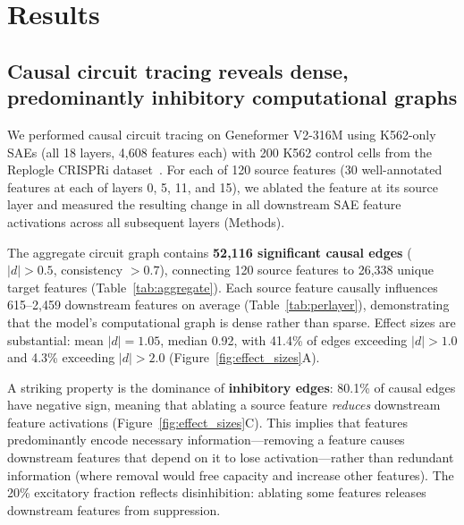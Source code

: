 \documentclass[onecolumn]{article}
\begin{document}
\section{Results}

\subsection{Causal circuit tracing reveals dense, predominantly inhibitory computational graphs}
\label{sec:circuits}

We performed causal circuit tracing on Geneformer V2-316M using K562-only SAEs (all 18 layers, 4,608 features each) with 200 K562 control cells from the Replogle CRISPRi dataset~\citep{replogle2022mapping}. For each of 120 source features (30 well-annotated features at each of layers 0, 5, 11, and 15), we ablated the feature at its source layer and measured the resulting change in all downstream SAE feature activations across all subsequent layers (Methods).

The aggregate circuit graph contains \textbf{52,116 significant causal edges} ($|d| > 0.5$, consistency $> 0.7$), connecting 120 source features to 26,338 unique target features (Table~\ref{tab:aggregate}). Each source feature causally influences 615--2,459 downstream features on average (Table~\ref{tab:perlayer}), demonstrating that the model's computational graph is dense rather than sparse. Effect sizes are substantial: mean $|d| = 1.05$, median 0.92, with 41.4\% of edges exceeding $|d| > 1.0$ and 4.3\% exceeding $|d| > 2.0$ (Figure~\ref{fig:effect_sizes}A).

A striking property is the dominance of \textbf{inhibitory edges}: 80.1\% of causal edges have negative sign, meaning that ablating a source feature \emph{reduces} downstream feature activations (Figure~\ref{fig:effect_sizes}C). This implies that features predominantly encode necessary information---removing a feature causes downstream features that depend on it to lose activation---rather than redundant information (where removal would free capacity and increase other features). The 20\% excitatory fraction reflects disinhibition: ablating some features releases downstream features from suppression.
\end{document}
